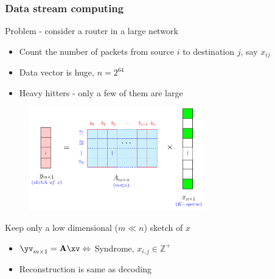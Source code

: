 \begin{frame} \frametitle{Data stream computing}
\vspace*{-0.1in}
\begin{block}{Problem - consider a router in a large network}
\begin{itemize}
\item Count the number of packets from source $i$ to destination $j$, say $x_{ij}$
\item Data vector is huge, $n = 2^{64}$
\item Heavy hitters - only a few of them are large
\end{itemize}
\end{block}

\vspace*{-0.1in}
\begin{figure}[t]
		\centering
		\includegraphics[width=3.0in]{./Figures/A_times_X_columns.pdf}
	\end{figure}
\vspace*{-0.2in}
\begin{block}{Keep only a low dimensional ($m \ll n$) sketch of $x$}	
\begin{itemize}
\item {\color{blue}$\yv_{m \times 1} = \mathbf{A} \xv \Leftrightarrow$} Syndrome, $x_{i,j} \in \mathbb{Z}^+$
\item Reconstruction is same as decoding
\end{itemize}	
\end{block}	

\end{frame}

